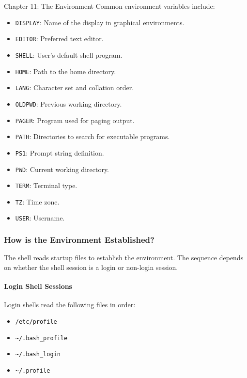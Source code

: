 \begin{notes}{Chapter 11: The Environment}
    Common environment variables include:
    \begin{itemize}
        \item \texttt{DISPLAY}: Name of the display in graphical environments.
        \item \texttt{EDITOR}: Preferred text editor.
        \item \texttt{SHELL}: User's default shell program.
        \item \texttt{HOME}: Path to the home directory.
        \item \texttt{LANG}: Character set and collation order.
        \item \texttt{OLDPWD}: Previous working directory.
        \item \texttt{PAGER}: Program used for paging output.
        \item \texttt{PATH}: Directories to search for executable programs.
        \item \texttt{PS1}: Prompt string definition.
        \item \texttt{PWD}: Current working directory.
        \item \texttt{TERM}: Terminal type.
        \item \texttt{TZ}: Time zone.
        \item \texttt{USER}: Username.
    \end{itemize}

    \subsubsection*{How is the Environment Established?}

    The shell reads startup files to establish the environment. The sequence depends on whether the shell session is a login or non-login session.

    \paragraph*{Login Shell Sessions}

    Login shells read the following files in order:
    \begin{itemize}
        \item \texttt{/etc/profile}
        \item \texttt{\~{}/.bash\_profile}
        \item \texttt{\~{}/.bash\_login}
        \item \texttt{\~{}/.profile}
    \end{itemize}


\end{notes}
